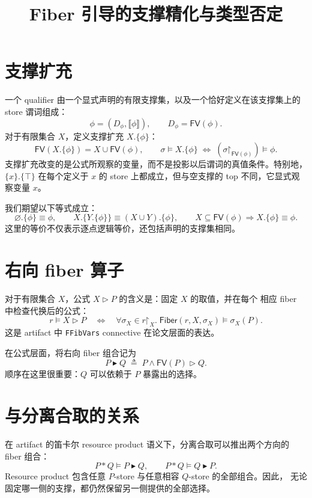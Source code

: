\documentclass[10pt]{ctexart}
\title{Fiber 引导的支撑精化与类型否定}
\author{}
\date{}
\newcommand{\FV}{\mathsf{FV}}
\newcommand{\Fib}{\mathsf{Fiber}}
\newcommand{\restr}{\mathord{\upharpoonright}}
\newcommand{\fiber}[2]{#1\mathbin{\triangleright}#2}
\newcommand{\rfcomp}{\mathbin{\blacktriangleright}}
\newcommand{\modelsr}{\mathrel{\models}}
\begin{document}
\pagestyle{plain}
\maketitle

\section{支撑扩充}

一个 qualifier 由一个显式声明的有限支撑集，以及一个恰好定义在该支撑集上的
store 谓词组成：
\[
  \phi=(D_\phi,\llbracket\phi\rrbracket),
  \qquad D_\phi=\FV(\phi).
\]
对于有限集合 $X$，定义支撑扩充 $X.\{\phi\}$：
\[
  \FV(X.\{\phi\})=X\cup\FV(\phi),
  \qquad
  \sigma\modelsr X.\{\phi\}
  \;\Longleftrightarrow\;
  (\sigma\restr_{\FV(\phi)})\modelsr\phi.
\]
支撑扩充改变的是公式所观察的变量，而不是投影以后谓词的真值条件。特别地，
$\{x\}.\{\top\}$ 在每个定义于 $x$ 的 store 上都成立，但与空支撑的 top
不同，它显式观察变量 $x$。

我们期望以下等式成立：
\[
  \varnothing.\{\phi\}\equiv\phi,
  \qquad
  X.\{Y.\{\phi\}\}\equiv(X\cup Y).\{\phi\},
  \qquad
  X\subseteq\FV(\phi)\Rightarrow X.\{\phi\}\equiv\phi.
\]
这里的等价不仅表示逐点逻辑等价，还包括声明的支撑集相同。

\section{右向 fiber 算子}

对于有限集合 $X$，公式 $\fiber{X}{P}$ 的含义是：固定 $X$ 的取值，并在每个
相应 fiber 中检查代换后的公式：
\begin{equation}\label{eq:fiber}
  r\modelsr\fiber{X}{P}
  \quad\Longleftrightarrow\quad
  \forall \sigma_X\in r\restr_X.\;
  \Fib(r,X,\sigma_X)\modelsr\sigma_X(P).
\end{equation}
这是 artifact 中 \texttt{FFibVars} connective 在论文层面的表达。

在公式层面，将右向 fiber 组合记为
\begin{equation}\label{eq:fcomp}
  P\rfcomp Q
  \;\triangleq\;
  P\land\fiber{\FV(P)}{Q}.
\end{equation}
顺序在这里很重要：$Q$ 可以依赖于 $P$ 暴露出的选择。

\section{与分离合取的关系}

在 artifact 的笛卡尔 resource product 语义下，分离合取可以推出两个方向的
fiber 组合：
\begin{equation}\label{eq:star-to-fiber}
  P*Q\modelsr P\rfcomp Q,
  \qquad
  P*Q\modelsr Q\rfcomp P.
\end{equation}
Resource product 包含任意 $P$-store 与任意相容 $Q$-store 的全部组合。因此，
无论固定哪一侧的支撑，都仍然保留另一侧提供的全部选择。
\end{document}
